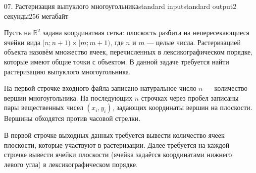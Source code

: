 \begin{problem}{07. Растеризация выпуклого многоугольника}{standard input}{standard output}{2 секунды}{256 мегабайт}

Пусть на $\mathbb R^2$ задана координатная сетка: плоскость разбита на непересекающиеся ячейки вида $[n; n + 1) \times [m; m + 1)$, где $n$ и $m$ --- целые числа. Растеризацией объекта назовём множество ячеек, перечисленных в лексикографическом порядке, которые имеют общие точки с объектом. В данной задаче требуется найти растеризацию выпуклого многоугольника.

\InputFile

На первой строчке входного файла записано натуральное число $n$ --- количество вершин многоугольника. На последующих $n$ строчках через пробел записаны пары вещественных чисел $(x_i, y_i)$, задающих координаты вершин на плоскости. Вершины обходятся против часовой стрелки.

\OutputFile

В первой строчке выходных данных требуется вывести количество ячеек плоскости, которые участвуют в растеризации. Далее требуется на каждой строчке вывести ячейки плоскости (ячейка задаётся координатами нижнего левого угла) в лексикографическом порядке.

\Examples

\begin{example}%
%
\end{example}

\end{problem}
